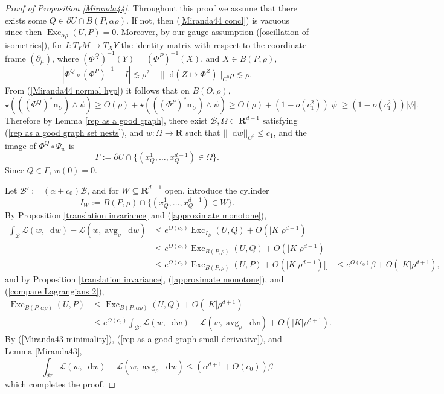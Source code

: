 \documentclass[reqno,11pt]{amsart}
\newcommand{\RR}{\mathbf{R}}
\DeclareMathOperator{\avg}{avg}
\DeclareMathOperator{\Exc}{Exc}
\newcommand*\dif{\mathop{}\!\mathrm{d}}
\newcommand{\Lagrange}{\mathscr L}
\newcommand{\normal}{\mathbf n}
\theoremstyle{definition}
\numberwithin{equation}{section}
\begin{document}
\begin{proof}[Proof of Proposition \ref{Miranda44}]
Throughout this proof we assume that there exists some $Q \in \partial U \cap B(P, \alpha \rho)$.
If not, then (\ref{Miranda44 concl}) is vacuous since then $\Exc_{\alpha \rho} (U, P) = 0$.
Moreover, by our gauge assumption (\ref{oscillation of isometries}), for $I: T_YM \to T_XY$ the identity matrix with respect to the coordinate frame $(\partial_\mu)$, where $(\Phi^Q)^{-1}(Y) = (\Phi^P)^{-1}(X)$, and $X \in B(P, \rho)$,
$$|\Phi^Q \circ (\Phi^P)^{-1} - I| \lesssim \rho^2 + ||\dif(Z \mapsto \Phi^Z)||_{C^0} \rho \lesssim \rho.$$
From (\ref{Miranda44 normal hyp}) it follows that on $B(O, \rho)$,
$$\star(((\Phi^Q)^* \normal_U) \wedge \psi) \geq O(\rho) + \star(((\Phi^P)^* \normal_U) \wedge \psi) \geq O(\rho) + (1 - o(c_1^2)) |\psi| \geq (1 - o(c_1^2)) |\psi|.$$
Therefore by Lemma \ref{rep as a good graph}, there exist $\mathscr B, \Omega \subset \RR^{d - 1}$ satisfying (\ref{rep as a good graph set nests}), and $w: \Omega \to \RR$ such that $||\dif w||_{C^0} \leq c_1$, and the image of $\Phi^Q \circ \Psi_w$ is
$$\Gamma := \partial U \cap \{(x_Q^1, \dots, x_Q^{d - 1}) \in \Omega\}.$$
Since $Q \in \Gamma$, $w(0) = 0$.

Let $\mathscr B' := (\alpha + c_0) \mathscr B$, and for $W \subseteq \RR^{d - 1}$ open, introduce the cylinder
$$I_W := B(P, \rho) \cap \{(x^1_Q, \dots, x^{d - 1}_Q) \in W\}.$$
By Proposition \ref{translation invariance} and (\ref{approximate monotone}),
\begin{align*}
\int_{\mathscr B} \Lagrange(w, \dif w) - \Lagrange(w, \avg_\rho \dif w) &\leq e^{O(c_0)} \Exc_{I_{\mathscr B}}(U, Q) + O(|K| \rho^{d + 1}) \\
&\leq e^{O(c_0)} \Exc_{B(P, \rho)} (U, Q) + O(|K| \rho^{d + 1}) \\
& \leq e^{O(c_0)} \Exc_{B(P, \rho)}(U, P) + O(|K| \rho^{d + 1}) ]]
&\leq e^{O(c_0)} \beta + O(|K| \rho^{d + 1}),
\end{align*}
and by Proposition \ref{translation invariance}, (\ref{approximate monotone}), and (\ref{compare Lagrangians 2}),
\begin{align*}
\Exc_{B(P, \alpha \rho)} (U, P) &\leq \Exc_{B(P, \alpha \rho)} (U, Q) + O(|K| \rho^{d + 1}) \\
&\leq e^{O(c_0)} \int_{\mathscr B'} \Lagrange(w, \dif w) - \Lagrange(w, \avg_\rho \dif w) + O(|K| \rho^{d + 1}).
\end{align*}
By (\ref{Miranda43 minimality}), (\ref{rep as a good graph small derivative}), and Lemma \ref{Miranda43},
$$\int_{\mathscr B'} \Lagrange(w, \dif w) - \Lagrange(w, \avg_\rho \dif w) \leq (\alpha^{d + 1} + O(c_0)) \beta$$
which completes the proof.
\end{proof}
\end{document}
